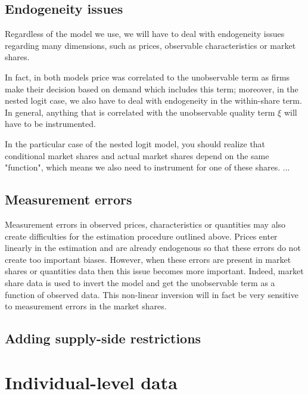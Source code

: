 \subsection{Endogeneity issues}

Regardless of the model we use, we will have to deal with endogeneity issues regarding many dimensions, such as prices, observable characteristics or market shares. 

In fact, in both models price was correlated to the unobservable term as firms make their decision based on demand which includes this term; moreover, in the nested logit case, we also have to deal with endogeneity in the within-share term. In general, anything that is correlated with the unobservable quality term $\xi$ will have to be instrumented.



In the particular case of the nested logit model, you should realize that conditional market shares and actual market shares depend on the same "function", which means we also need to instrument for one of these shares. ...

\subsection{Measurement errors}

Measurement errors in observed prices, characteristics or quantities may also create difficulties for the estimation procedure outlined above. Prices enter linearly in the estimation and are already endogenous so that these errors do not create too important biases. However, when these errors are present in market shares or quantities data then this issue becomes more important. Indeed, market share data is used to invert the model and get the unobservable term as a function of observed data. This non-linear inversion will in fact be very sensitive to measurement errors in the market shares.

\subsection{Adding supply-side restrictions}



\section{Individual-level data}


